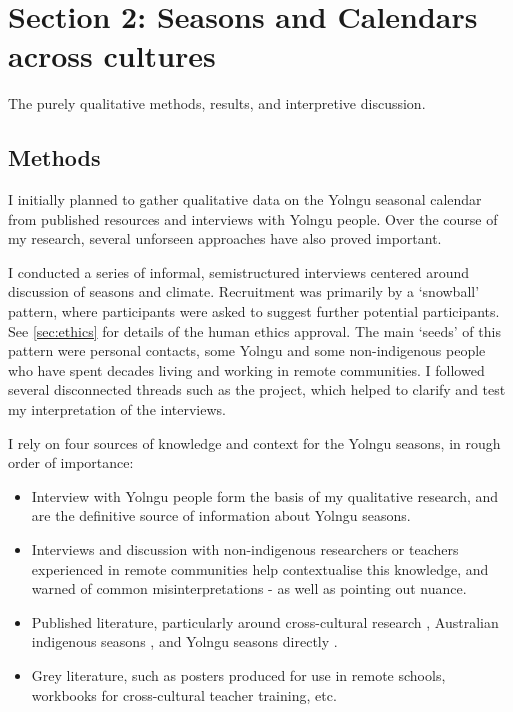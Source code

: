 \chapter{Section 2:  Seasons and Calendars across cultures}
The purely qualitative methods, results, and interpretive discussion.

\section{Methods}

I initially planned to gather qualitative data on the Yolngu seasonal calendar
from published resources and interviews with Yolngu people.
Over the course of my research, several unforseen approaches have also proved important.

I conducted a series of informal, semistructured interviews centered around discussion of seasons and climate.
Recruitment was primarily by a `snowball' pattern, where participants were asked to
suggest further potential participants.
See \autoref{sec:ethics} for details of the human ethics approval.
The main `seeds' of this pattern were personal contacts, some Yolngu and some non-indigenous
people who have spent decades living and working in remote communities.
I followed several disconnected threads such as the \citet{CSIROcals} project,
which helped to clarify and test my interpretation of the interviews.

I rely on four sources of knowledge and context for the Yolngu seasons, in rough order of importance:

\begin{itemize}
\item Interview with Yolngu people form the basis of my qualitative research, and
        are the definitive source of information about Yolngu seasons.
\item Interviews and discussion with non-indigenous researchers or teachers experienced
        in remote communities help contextualise this knowledge, and warned of
        common misinterpretations - as well as pointing out nuance.
\item Published literature, particularly around cross-cultural research \citep[eg.][]{smith1999},
        Australian indigenous seasons \citep[eg.][]{prober2011,oconnor2010}, and Yolngu
        seasons directly \citep{davis1989}.
\item Grey literature, such as posters produced for use in remote schools, workbooks
        for cross-cultural teacher training, etc.
\end{itemize}

